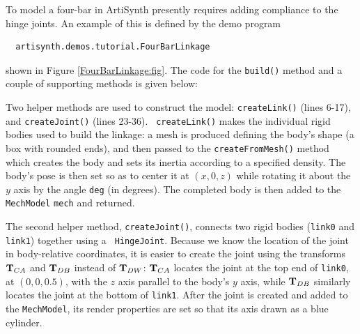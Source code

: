 To model a four-bar in ArtiSynth presently requires adding compliance
to the hinge joints. An example of this is defined by the demo program
%
\begin{verbatim}
  artisynth.demos.tutorial.FourBarLinkage
\end{verbatim}
%
shown in Figure \ref{FourBarLinkage:fig}.
The code for the {\tt build()} method and a couple of supporting
methods is given below:
\lstset{numbers=left}
\iflatexml
  
\else
  
\fi
\lstset{numbers=none}
Two helper methods are used to construct the model: {\tt createLink()}
(lines 6-17), and {\tt createJoint()} (lines 23-36).  {\tt
createLink()} makes the individual rigid bodies used to build the
linkage: a mesh is produced defining the body's shape (a box with
rounded ends), and then passed to the
{\tt createFromMesh()} method which creates the body and sets its
inertia according to a specified density. The body's pose is then set
so as to center it at $(x, 0, z)$ while rotating it about the $y$ axis
by the angle {\tt deg} (in degrees). The completed body is then added to the
{\tt MechModel} {\tt mech} and returned.

The second helper method, {\tt createJoint()}, connects two rigid
bodies ({\tt link0} and {\tt link1}) together using a {\tt
HingeJoint}. Because we know the location of the joint in
body-relative coordinates, it is easier to create the joint using the
transforms ${\bf T}_{CA}$ and ${\bf T}_{DB}$ instead of ${\bf T}_{DW}$: ${\bf T}_{CA}$
locates the joint at the top end of {\tt link0}, at $(0, 0, 0.5)$,
with the $z$ axis parallel to the body's $y$ axis, while ${\bf T}_{DB}$
similarly locates the joint at the bottom of {\tt link1}.  After the
joint is created and added to the {\tt MechModel}, its render
properties are set so that its axis drawn as a blue cylinder.

